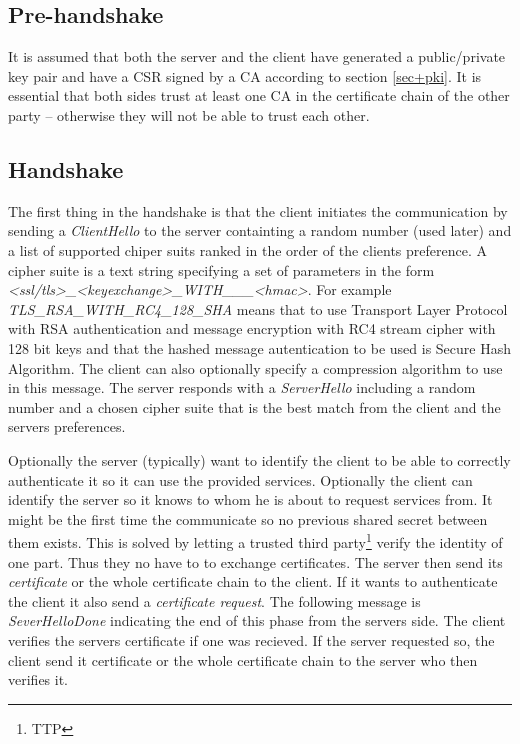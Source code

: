 \documentclass[10pt, a4paper]{article}
\begin{document}
\subsection{Pre-handshake}
It is assumed that both the server and the client have generated a public/private key pair and have a CSR signed by a CA according to section \ref{sec+pki}. It is essential that both sides trust at least one CA in the certificate chain of the other party -- otherwise they will not be able to trust each other.

\subsection{Handshake}
The first thing in the handshake is that the client initiates the communication by sending a \emph{ClientHello} to the server containting a random number (used later) and a list of supported chiper suits ranked in the order of the clients preference. A cipher suite is a text string specifying a set of parameters in the form \emph{<ssl/tls>\_<keyexchange>\_WITH\_<encyption-type>\_<enc-key-size>\_<hmac>}. For example \emph{TLS\_RSA\_WITH\_RC4\_128\_SHA} means that to use Transport Layer Protocol with RSA authentication and message encryption with RC4 stream cipher with 128 bit keys and that the hashed message autentication to be used is Secure Hash Algorithm. The client can also optionally specify a compression algorithm to use in this message. The server responds with a \emph{ServerHello} including a random number and a chosen cipher suite that is the best match from the client and the servers preferences.

Optionally the server (typically) want to identify the client to be able to correctly authenticate it so it can use the provided services. Optionally the client can identify the server so it knows to whom he is about to request services from. It might be the first time the communicate so no previous shared secret between them exists. This is solved by letting a trusted third party\footnote{TTP} verify the identity of one part. Thus they no have to to exchange certificates. The server then send its \emph{certificate} or the whole certificate chain to the client. If it wants to authenticate the client it also send a \emph{certificate request}. The following message is \emph{SeverHelloDone} indicating the end of this phase from the servers side.  The client verifies the servers certificate if one was recieved. If the server requested so, the client send it certificate or the whole certificate chain to the server who then verifies it.
\end{document}
